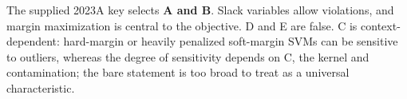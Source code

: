 The supplied 2023A key selects \textbf{A and B}. Slack variables allow violations, and margin maximization is central to the objective. D and E are false. C is context-dependent: hard-margin or heavily penalized soft-margin SVMs can be sensitive to outliers, whereas the degree of sensitivity depends on C, the kernel and contamination; the bare statement is too broad to treat as a universal characteristic.
